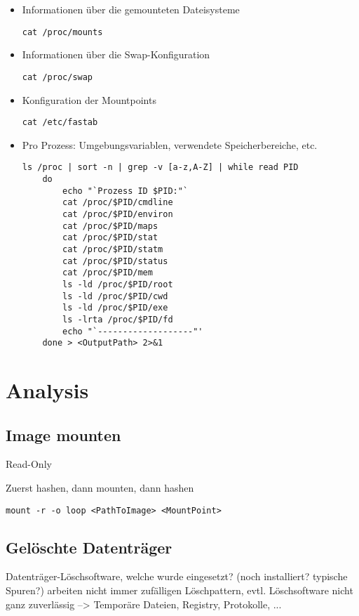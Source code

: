 \begin{itemize}
\item  Informationen über die gemounteten Dateisysteme
\begin{lstlisting}
cat /proc/mounts
\end{lstlisting}

\item  Informationen über die Swap-Konfiguration
\begin{lstlisting}
cat /proc/swap
\end{lstlisting}

\item  Konfiguration der Mountpoints
\begin{lstlisting}
cat /etc/fastab
\end{lstlisting}

\item  Pro Prozess: Umgebungsvariablen, verwendete Speicherbereiche, etc.
\begin{lstlisting}
ls /proc | sort -n | grep -v [a-z,A-Z] | while read PID
	do
		echo "`Prozess ID $PID:"`
		cat /proc/$PID/cmdline
		cat /proc/$PID/environ
		cat /proc/$PID/maps
		cat /proc/$PID/stat
		cat /proc/$PID/statm
		cat /proc/$PID/status
		cat /proc/$PID/mem
		ls -ld /proc/$PID/root
		ls -ld /proc/$PID/cwd
		ls -ld /proc/$PID/exe
		ls -lrta /proc/$PID/fd
		echo "`-------------------"'
	done > <OutputPath> 2>&1
\end{lstlisting}
\end{itemize}





\section{Analysis}

\subsection{Image mounten}
Read-Only

Zuerst hashen, dann mounten, dann hashen
\begin{lstlisting}
mount -r -o loop <PathToImage> <MountPoint>
\end{lstlisting}

\subsection{Gelöschte Datenträger}
Datenträger-Löschsoftware, welche wurde eingesetzt? (noch installiert? typische Spuren?) arbeiten nicht immer zufälligen Löschpattern, evtl. Löschsoftware nicht ganz zuverlässig --> Temporäre Dateien, Registry, Protokolle, ...


